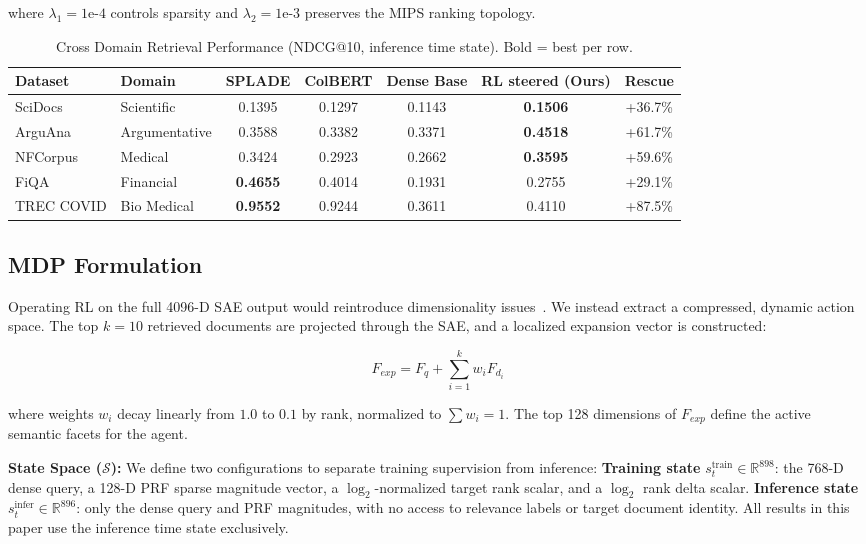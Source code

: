 \documentclass[sigconf]{acmart}
\begin{document}
where $\lambda_1 = 1\text{e-}4$ controls sparsity and $\lambda_2 = 1\text{e-}3$ preserves the MIPS ranking topology.

\begin{table}[t]
  \caption{Cross Domain Retrieval Performance (NDCG@10, inference time state). Bold = best per row.}
  \label{tab:results}
  \begin{tabular}{llccccc}
    \toprule
    Dataset & Domain & SPLADE & ColBERT & Dense Base & RL steered (Ours) & Rescue\\
    \midrule
    SciDocs & Scientific & 0.1395 & 0.1297 & 0.1143 & \textbf{0.1506} & +36.7\%\\
    ArguAna & Argumentative & 0.3588 & 0.3382 & 0.3371 & \textbf{0.4518} & +61.7\%\\
    NFCorpus & Medical & 0.3424 & 0.2923 & 0.2662 & \textbf{0.3595} & +59.6\%\\
    FiQA & Financial & \textbf{0.4655} & 0.4014 & 0.1931 & 0.2755 & +29.1\%\\
    TREC COVID & Bio Medical & \textbf{0.9552} & 0.9244 & 0.3611 & 0.4110 & +87.5\%\\
    \bottomrule
  \end{tabular}
\end{table}

\subsection{MDP Formulation}

Operating RL on the full 4096-D SAE output would reintroduce dimensionality issues~\cite{lillicrap2016}. We instead extract a compressed, dynamic action space. The top $k{=}10$ retrieved documents are projected through the SAE, and a localized expansion vector is constructed:

\begin{equation}
F_{exp} = F_q + \sum_{i=1}^{k} w_i F_{d_i}
\end{equation}

where weights $w_i$ decay linearly from $1.0$ to $0.1$ by rank, normalized to $\sum w_i = 1$. The top 128 dimensions of $F_{exp}$ define the active semantic facets for the agent.

\textbf{State Space ($\mathcal{S}$):} We define two configurations to separate training supervision from inference:
\textbf{Training state} $s_t^{\text{train}} \in \mathbb{R}^{898}$: the 768-D dense query, a 128-D PRF sparse magnitude vector, a $\log_2$-normalized target rank scalar, and a $\log_2$ rank delta scalar.
\textbf{Inference state} $s_t^{\text{infer}} \in \mathbb{R}^{896}$: only the dense query and PRF magnitudes, with no access to relevance labels or target document identity. All results in this paper use the inference time state exclusively.
\end{document}
